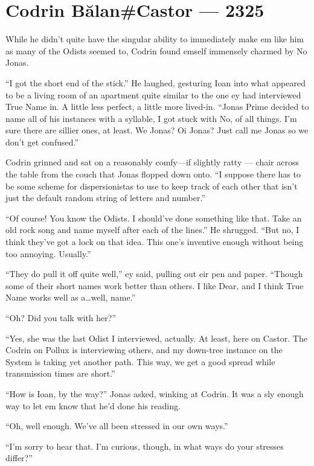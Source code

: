 \hypertarget{codrin-bux103lancastor-2325}{%
\chapter{Codrin Bălan\#Castor — 2325}\label{codrin-bux103lancastor-2325}}

While he didn't quite have the singular ability to immediately make em like him as many of the Odists seemed to, Codrin found emself immensely charmed by No Jonas.

``I got the short end of the stick.'' He laughed, gesturing Ioan into what appeared to be a living room of an apartment quite similar to the one ey had interviewed True Name in. A little less perfect, a little more lived-in. ``Jonas Prime decided to name all of his instances with a syllable, I got stuck with No, of all things. I'm sure there are sillier ones, at least. We Jonas? Oi Jonas? Just call me Jonas so we don't get confused.''

Codrin grinned and sat on a reasonably comfy---if slightly ratty — chair across the table from the couch that Jonas flopped down onto. ``I suppose there has to be some scheme for dispersionistas to use to keep track of each other that isn't just the default random string of letters and number.''

``Of course! You know the Odists. I should've done something like that. Take an old rock song and name myself after each of the lines.'' He shrugged. ``But no, I think they've got a lock on that idea. This one's inventive enough without being too annoying. Usually.''

``They do pull it off quite well,'' ey said, pulling out eir pen and paper. ``Though some of their short names work better than others. I like Dear, and I think True Name works well as a\ldots well, name.''

``Oh? Did you talk with her?''

``Yes, she was the last Odist I interviewed, actually. At least, here on Castor. The Codrin on Pollux is interviewing others, and my down-tree instance on the System is taking yet another path. This way, we get a good spread while transmission times are short.''

``How is Ioan, by the way?'' Jonas asked, winking at Codrin. It was a sly enough way to let em know that he'd done his reading.

``Oh, well enough. We've all been stressed in our own ways.''

``I'm sorry to hear that. I'm curious, though, in what ways do your stresses differ?''


